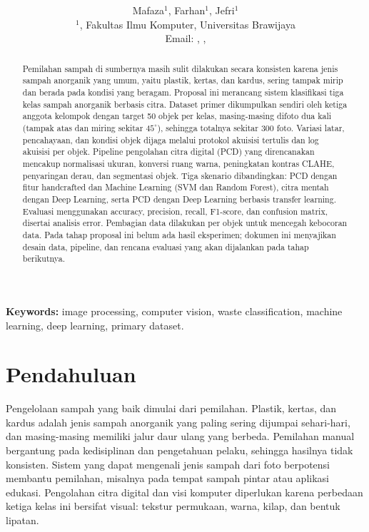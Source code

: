 \documentclass[10pt,twocolumn,a4paper]{article}
\title{\bfseries \projecttitle}
\author{
Mafaza$^{1}$, Farhan$^{1}$, Jefri$^{1}$\\[-1mm]
\small $^{1}$\isian{Program Studi}, Fakultas Ilmu Komputer, Universitas Brawijaya\\
\small Email: \isian{email Mafaza}, \isian{email Farhan}, \isian{email Jefri}
}
\date{}
\begin{document}
\maketitle

\begin{abstract}
Pemilahan sampah di sumbernya masih sulit dilakukan secara konsisten karena jenis sampah anorganik yang umum, yaitu plastik, kertas, dan kardus, sering tampak mirip dan berada pada kondisi yang beragam. Proposal ini merancang sistem klasifikasi tiga kelas sampah anorganik berbasis citra. Dataset primer dikumpulkan sendiri oleh ketiga anggota kelompok dengan target 50 objek per kelas, masing-masing difoto dua kali (tampak atas dan miring sekitar $45^{\circ}$), sehingga totalnya sekitar 300 foto. Variasi latar, pencahayaan, dan kondisi objek dijaga melalui protokol akuisisi tertulis dan log akuisisi per objek. Pipeline pengolahan citra digital (PCD) yang direncanakan mencakup normalisasi ukuran, konversi ruang warna, peningkatan kontras CLAHE, penyaringan derau, dan segmentasi objek. Tiga skenario dibandingkan: PCD dengan fitur handcrafted dan Machine Learning (SVM dan Random Forest), citra mentah dengan Deep Learning, serta PCD dengan Deep Learning berbasis transfer learning. Evaluasi menggunakan accuracy, precision, recall, F1-score, dan confusion matrix, disertai analisis error. Pembagian data dilakukan per objek untuk mencegah kebocoran data. Pada tahap proposal ini belum ada hasil eksperimen; dokumen ini menyajikan desain data, pipeline, dan rencana evaluasi yang akan dijalankan pada tahap berikutnya.
\end{abstract}

\noindent\textbf{Keywords:} image processing, computer vision, waste classification, machine learning, deep learning, primary dataset.

\section{Pendahuluan}
Pengelolaan sampah yang baik dimulai dari pemilahan. Plastik, kertas, dan kardus adalah jenis sampah anorganik yang paling sering dijumpai sehari-hari, dan masing-masing memiliki jalur daur ulang yang berbeda. Pemilahan manual bergantung pada kedisiplinan dan pengetahuan pelaku, sehingga hasilnya tidak konsisten. Sistem yang dapat mengenali jenis sampah dari foto berpotensi membantu pemilahan, misalnya pada tempat sampah pintar atau aplikasi edukasi. Pengolahan citra digital dan visi komputer diperlukan karena perbedaan ketiga kelas ini bersifat visual: tekstur permukaan, warna, kilap, dan bentuk lipatan.
\end{document}
